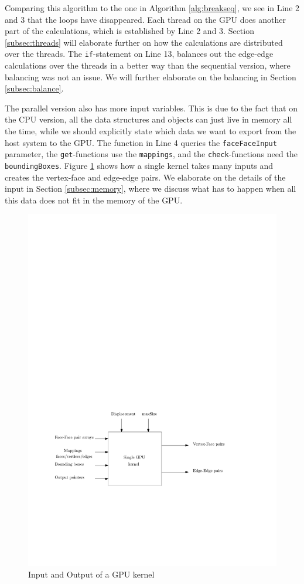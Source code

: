 Comparing this algorithm to the one in Algorithm \ref{alg:breakseq}, we see in Line 2 and 3 that the loops have disappeared. Each thread on the GPU does another part of the calculations, which is established by Line 2 and 3. Section \ref{subsec:threads} will elaborate further on how the calculations are distributed over the threads. The \texttt{if}-statement on Line 13, balances out the edge-edge calculations over the threads in a better way than the sequential version, where balancing was not an issue. We will further elaborate on the balancing in Section \ref{subsec:balance}.

 The parallel version also has more input variables. This is due to the fact that on the CPU version, all the data structures and objects can just live in memory all the time, while we should explicitly state which data we want to export from the host system to the GPU. The function in Line 4 queries the \texttt{faceFaceInput} parameter, the \texttt{get}-functions use the \texttt{mappings}, and the \texttt{check}-functions need the \texttt{boundingBoxes}. Figure \ref{fig:kernel} shows how a single kernel takes many inputs and creates the vertex-face and edge-edge pairs. We elaborate on the details of the input in Section \ref{subsec:memory}, where we discuss what has to happen when all this data does not fit in the memory of the GPU.

\begin{figure}
	\includegraphics{threadbox.pdf}
	\caption{Input and Output of a GPU kernel}
	\label{fig:kernel}
\end{figure}

